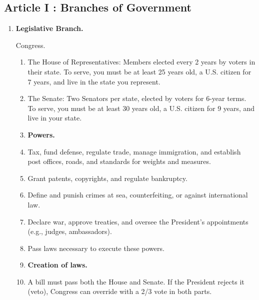 \documentclass{article}
\begin{document}
\begin{multicols}{2}
\section*{Article I : Branches of Government}

\begin{enumerate}[label=\Alph*)]
    \item \textbf{Legislative Branch.}
    
    Congress.
    
    \begin{enumerate}[label=1.1.\arabic*]
        \item The House of Representatives: Members elected every 2 years by voters in their state. To serve, you must be at least 25 years old, a U.S. citizen for 7 years, and live in the state you represent.
        
        \item The Senate: Two Senators per state, elected by voters for 6-year terms. To serve, you must be at least 30 years old, a U.S. citizen for 9 years, and live in your state.
        
        \item[] \textbf{Powers.}
        
        \item Tax, fund defense, regulate trade, manage immigration, and establish post offices, roads, and standards for weights and measures.
        
        \item Grant patents, copyrights, and regulate bankruptcy.
        
        \item Define and punish crimes at sea, counterfeiting, or against international law.
        
        \item Declare war, approve treaties, and oversee the President’s appointments (e.g., judges, ambassadors).
        
        \item Pass laws necessary to execute these powers.
        
        \item[] \textbf{Creation of laws.}
        
        \item A bill must pass both the House and Senate. If the President rejects it (veto), Congress can override with a 2/3 vote in both parts.
        

\end{enumerate}
\end{enumerate}
\end{multicols}
\end{document}
